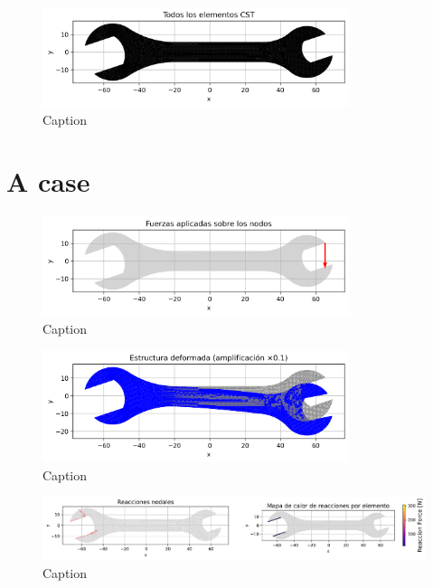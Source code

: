 \documentclass{article}  %
\begin{document}
\begin{figure}[H]
  \centering
  \includegraphics[width=0.8\textwidth]{GRAFICOS/Case a_elementos.png}
  \caption{Caption}
  \label{fig:deformed_shape}
\end{figure}

\section{A case}

\begin{figure}[H]
  \centering
  \includegraphics[width=0.8\textwidth]{GRAFICOS/Case a_fuerzas.png}
  \caption{Caption}
  \label{fig:strain}
\end{figure}

\begin{figure}[H]
  \centering
  \includegraphics[width=0.8\textwidth]{GRAFICOS/Case a_deformada.png}
  \caption{Caption}
  \label{fig:stress}
\end{figure}

\begin{figure}[H]
  \centering
  \includegraphics[width=1\textwidth]{GRAFICOS/Case a_deformada_reacciones.png}
  \caption{Caption}
  \label{fig:principal}
\end{figure}
\end{document}
